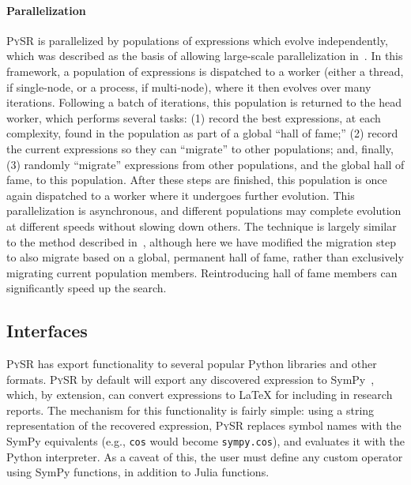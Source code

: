 \documentclass[letterpaper,twocolumn]{scrartcl}
\newcommand\pysr{\textsc{PySR}\xspace}
\begin{document}
\paragraph{Parallelization}

\pysr is parallelized by populations of expressions which evolve independently, which was described as the basis of allowing large-scale parallelization in~\cite{goldbergComparativeAnalysisSelection1991}.
In this framework, a population of expressions is dispatched to a worker (either a thread, if single-node, or a process, if multi-node), where it then evolves over many iterations.
Following a batch of iterations, this population is returned to the head worker, which performs several tasks:
(1) record the best expressions, at each complexity, found in the population as part of a global ``hall of fame;''
(2) record the current expressions so they can ``migrate'' to other populations; and, finally,
(3) randomly ``migrate'' expressions from other populations, and the global hall of fame, to this population.
After these steps are finished, this population is once again dispatched to a worker where it undergoes further evolution.
This parallelization is asynchronous, and different populations may complete evolution at different speeds without slowing down others.
The technique is largely similar to the method described in~\cite{schmidtDistillingFreeFormNatural2009}, although here we have modified the migration step to also migrate based on a global, permanent hall of fame, rather than exclusively migrating current population members.
Reintroducing hall of fame members can significantly speed up the search.


\subsection{Interfaces}
\label{sec:interfaces}

\pysr has export functionality to several popular Python libraries and other formats.
\pysr by default will export any discovered expression to SymPy~\cite{sympy}, which, by extension, can convert expressions to LaTeX for including in research reports.
The mechanism for this functionality is fairly simple: using a string representation of the recovered expression, \pysr replaces symbol names with the SymPy equivalents (e.g., \texttt{cos} would become \texttt{sympy.cos}),
and evaluates it with the Python interpreter.
As a caveat of this, the user must define any custom operator using SymPy functions, in addition to Julia functions.
\end{document}
